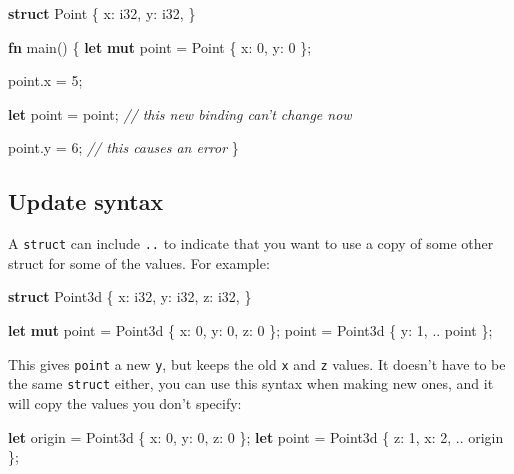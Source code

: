 \documentclass[a4paper,]{book}
\newenvironment{Shaded}{\begin{snugshade}}{\end{snugshade}}
\newcommand{\KeywordTok}[1]{\textcolor[rgb]{0.13,0.29,0.53}{\textbf{{#1}}}}
\newcommand{\DataTypeTok}[1]{\textcolor[rgb]{0.13,0.29,0.53}{{#1}}}
\newcommand{\DecValTok}[1]{\textcolor[rgb]{0.00,0.00,0.81}{{#1}}}
\newcommand{\CommentTok}[1]{\textcolor[rgb]{0.56,0.35,0.01}{\textit{{#1}}}}
\newcommand{\NormalTok}[1]{{#1}}
\begin{document}
\begin{Shaded}
\begin{Highlighting}[]
\KeywordTok{struct} \NormalTok{Point \{}
    \NormalTok{x: }\DataTypeTok{i32}\NormalTok{,}
    \NormalTok{y: }\DataTypeTok{i32}\NormalTok{,}
\NormalTok{\}}

\KeywordTok{fn} \NormalTok{main() \{}
    \KeywordTok{let} \KeywordTok{mut} \NormalTok{point = Point \{ x: }\DecValTok{0}\NormalTok{, y: }\DecValTok{0} \NormalTok{\};}

    \NormalTok{point.x = }\DecValTok{5}\NormalTok{;}

    \KeywordTok{let} \NormalTok{point = point; }\CommentTok{// this new binding can’t change now}

    \NormalTok{point.y = }\DecValTok{6}\NormalTok{; }\CommentTok{// this causes an error}
\NormalTok{\}}
\end{Highlighting}
\end{Shaded}

\subsection{Update syntax}\label{update-syntax}

A \texttt{struct} can include \texttt{..} to indicate that you want to
use a copy of some other struct for some of the values. For example:

\begin{Shaded}
\begin{Highlighting}[]
\KeywordTok{struct} \NormalTok{Point3d \{}
    \NormalTok{x: }\DataTypeTok{i32}\NormalTok{,}
    \NormalTok{y: }\DataTypeTok{i32}\NormalTok{,}
    \NormalTok{z: }\DataTypeTok{i32}\NormalTok{,}
\NormalTok{\}}

\KeywordTok{let} \KeywordTok{mut} \NormalTok{point = Point3d \{ x: }\DecValTok{0}\NormalTok{, y: }\DecValTok{0}\NormalTok{, z: }\DecValTok{0} \NormalTok{\};}
\NormalTok{point = Point3d \{ y: }\DecValTok{1}\NormalTok{, .. point \};}
\end{Highlighting}
\end{Shaded}

This gives \texttt{point} a new \texttt{y}, but keeps the old \texttt{x}
and \texttt{z} values. It doesn't have to be the same \texttt{struct}
either, you can use this syntax when making new ones, and it will copy
the values you don't specify:

\begin{Shaded}
\begin{Highlighting}[]
\KeywordTok{let} \NormalTok{origin = Point3d \{ x: }\DecValTok{0}\NormalTok{, y: }\DecValTok{0}\NormalTok{, z: }\DecValTok{0} \NormalTok{\};}
\KeywordTok{let} \NormalTok{point = Point3d \{ z: }\DecValTok{1}\NormalTok{, x: }\DecValTok{2}\NormalTok{, .. origin \};}
\end{Highlighting}
\end{Shaded}
\end{document}
